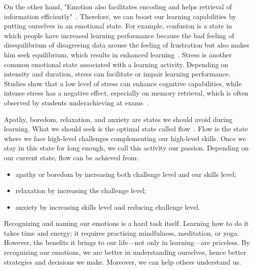 \documentclass{article}
\begin{document}
On the other hand, "Emotion also facilitates encoding and helps retrieval of information efficiently"~\cite{tyng2017influences}. Therefore, we can boost our learning capabilities by putting ourselves in an emotional state. For example, confusion is a state in which people have increased learning performance because the bad feeling of disequilibrium of disagreeing data arouse the feeling of frustration but also makes him seek equilibrium, which results in enhanced learning~\cite{d2014confusion}. Stress is another common emotional state associated with a learning activity. Depending on intensity and duration, stress can facilitate or impair learning performance. Studies show that a low level of stress can enhance cognitive capabilities, while intense stress has a negative effect, especially on memory retrieval, which is often observed by students underachieving at exams~\cite{vogel2016learning}. 

Apathy, boredom, relaxation, and anxiety are states we should avoid during learning. What we should seek is the optimal state called flow~\cite{csikszentmihalyi1990flow}. Flow is the state where we face high-level challenges complementing our high-level skills. Once we stay in this state for long enough, we call this activity our passion.  Depending on our current state, flow can be achieved from:
\begin{itemize}
    \item apathy or boredom by increasing both challenge level and our skills level;
    \item relaxation by increasing the challenge level;
    \item anxiety by increasing skills level and reducing challenge level.
\end{itemize}

Recognizing and naming our emotions is a hard task itself. Learning how to do it takes time and energy; it requires practising mindfulness, meditation, or yoga. However, the benefits it brings to our life—not only in learning—are priceless. By recognizing our emotions, we are better in understanding ourselves, hence better strategies and decisions we make. Moreover, we can help others understand us.
\end{document}
